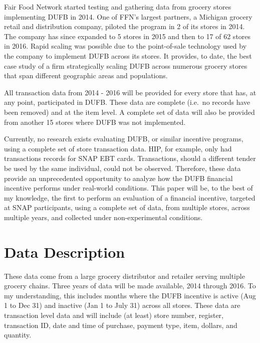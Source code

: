 \documentclass[12pt,letterpaperpaper,]{book}
\begin{document}
Fair Food Network started testing and gathering data from grocery stores
implementing DUFB in 2014. One of FFN's largest partners, a Michigan
grocery retail and distribution company, piloted the program in 2 of its
stores in 2014. The company has since expanded to 5 stores in 2015 and
then to 17 of 62 stores in 2016. Rapid scaling was possible due to the
point-of-sale technology used by the company to implement DUFB across
its stores. It provides, to date, the best case study of a firm
strategically scaling DUFB across numerous grocery stores that span
different geographic areas and populations.

All transaction data from 2014 - 2016 will be provided for every store
that has, at any point, participated in DUFB. These data are complete
(i.e.~no records have been removed) and at the item level. A complete
set of data will also be provided from another 15 stores where DUFB was
not implemented.

Currently, no research exists evaluating DUFB, or similar incentive
programs, using a complete set of store transaction data. HIP, for
example, only had transactions records for SNAP EBT cards. Transactions,
should a different tender be used by the same individual, could not be
observed. Therefore, these data provide an unprecedented opportunity to
analyze how the DUFB financial incentive performs under real-world
conditions. This paper will be, to the best of my knowledge, the first
to perform an evaluation of a financial incentive, targeted at SNAP
participants, using a complete set of data, from multiple stores, across
multiple years, and collected under non-experimental conditions.

\newpage

\hypertarget{data-1}{\section*{Data Description}\label{data-1}}

These data come from a large grocery distributor and retailer serving
multiple grocery chains. Three years of data will be made available,
2014 through 2016. To my understanding, this includes months where the
DUFB incentive is active (Aug 1 to Dec 31) and inactive (Jan 1 to July
31) across all stores. These data are transaction level data and will
include (at least) store number, register, transaction ID, date and time
of purchase, payment type, item, dollars, and quantity.
\end{document}
